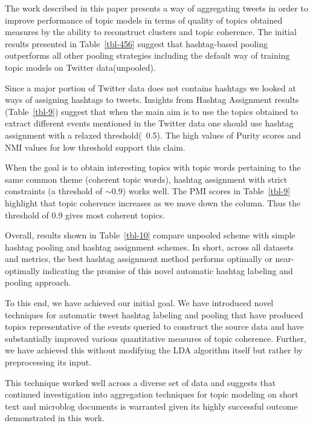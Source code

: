 \documentclass[10pt,a5paper,twoside]{article}
\begin{document}
\label{sec:conclusion}

The work described in this paper presents a way of aggregating tweets
in order to improve performance of topic models in terms of quality of
topics obtained measures by the ability to reconstruct clusters and
topic coherence. The initial results presented in Table~\ref{tbl-456}
suggest that hashtag-based pooling outperforms all other pooling
strategies including the default way of training topic models on
Twitter data(unpooled).

Since a major portion of Twitter data does not contains hashtags we
looked at ways of assigning hashtags to tweets. Insights from Hashtag
Assignment results (Table~\ref{tbl-9}) suggest that when the main aim
is to use the topics obtained to extract different events mentioned in
the Twitter data one should use hashtag assignment with a relaxed
threshold(~0.5). The high values of Purity scores and NMI values for
low threshold support this claim.

When the goal is to obtain interesting topics with topic words
pertaining to the same common theme (coherent topic words), hashtag
assignment with strict constraints (a threshold of $\sim 0.9$) works
well. The PMI scores in Table~\ref{tbl-9} highlight that topic
coherence increases as we move down the column. Thus the threshold of
0.9 gives most coherent topics.

Overall, results shown in Table~\ref{tbl-10} compare unpooled scheme
with simple hashtag pooling and hashtag assignment schemes.  In short,
across all datasets and metrics, the best hashtag assignment method
performs optimally or near-optimally indicating the promise of this
novel automatic hashtag labeling and pooling approach.

To this end, we have achieved our initial goal.  We have introduced
novel techniques for automatic tweet hashtag labeling and pooling that
have produced topics representative of the events queried to construct
the source data and have substantially improved various quantitative
measures of topic coherence.  Further, we have achieved this without
modifying the LDA algorithm itself but rather by preprocessing its
input.

This technique worked well across a diverse set of data and suggests
that continued investigation into aggregation techniques for topic
modeling on short text and microblog documents is warranted given its
highly successful outcome demonstrated in this work.

%
\end{document}
